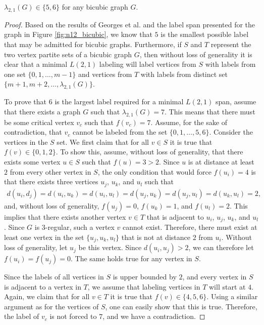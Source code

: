 \documentclass[12pt]{article}
\begin{document}
\begin{thm}
$\lambda_{2,1}(G) \in \{5,6\}$ for any bicubic graph $G$. 
\end{thm}
\begin{proof}
Based on the results of Georges et al. \cite{Georges03} and the label span presented for the graph in Figure \ref{fig:n12_bicubic}, we know that $5$ is the smallest possible label that may be admitted for bicubic graphs. Furthermore, if $S$ and $T$ represent the two vertex partite sets of a bicubic graph $G$, then without loss of generality it is clear that a minimal $L(2,1)$ labeling will label vertices from $S$ with labels from one set $\{0,1,\dots,m-1\}$ and vertices from $T$ with labels from distinct set $\{m+1,m+2,\dots,\lambda_{2,1}(G)\}$. 

To prove that $6$ is the largest label required for a minimal $L(2,1)$ span, assume that there exists a graph $G$ such that $\lambda_{2,1}(G) = 7$. This means that there must be some critical vertex $v_c$ such that $f(v_c) = 7$. Assume, for the sake of contradiction, that $v_c$ cannot be labeled from the set $\{0,1,\dots,5,6\}$. Consider the vertices in the $S$ set. We first claim that for all $v \in S$ it is true that $f(v) \in \{0,1,2\}$. To show this, assume, without loss of generality, that there exists some vertex $u \in S$ such that $f(u) = 3 > 2$. Since $u$ is at distance at least $2$ from every other vertex in $S$, the only condition that would force $f(u_i) = 4$ is that there exists three vertices $u_j$, $u_k$, and $u_l$ such that
\begin{align*} 
d(u_i,d_j) = d(u_i, u_k) = d(u_i,u_l) = d(u_j,u_k) = d(u_j,u_l) = d(u_k,u_l) = 2,
\end{align*}
and, without loss of generality, $f(u_j) = 0$, $f(u_k) = 1$, and $f(u_l) = 2$. This implies that there exists another vertex $v \in T$ that is adjacent to $u_i$, $u_j$, $u_k$, and $u_l$. Since $G$ is 3-regular, such a vertex $v$ cannot exist. Therefore, there must exist at least one vertex in the set $\{u_j,u_k,u_l\}$ that is not at distance $2$ from $u_i$. Without loss of generality, let $u_j$ be this vertex. Since $d(u_i,u_j) > 2$, we can therefore let $f(u_i) = f(u_j) = 0$. The same holds true for any vertex in $S$.

Since the labels of all vertices in $S$ is upper bounded by $2$, and every vertex in $S$ is adjacent to a vertex in $T$, we assume that labeling vertices in $T$ will start at $4$. Again, we claim that for all $v \in T$ it is true that $f(v) \in \{4,5,6\}$. Using a similar argument as for the vertices of $S$, one can easily show that this is true. Therefore, the label of $v_c$ is not forced to $7$, and we have a contradiction.


\end{proof}
\end{document}
